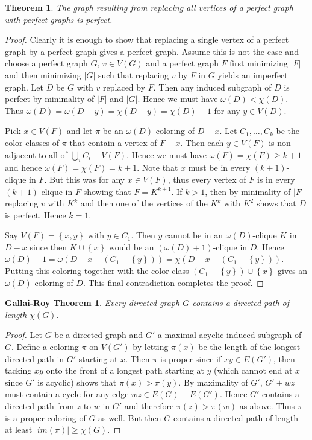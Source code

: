 \documentclass[12pt]{article}
\theoremstyle{plain}
\newtheorem{thm}{Theorem}
\newtheorem*{GallaiRoy}{Gallai-Roy Theorem}
\theoremstyle{definition}
\theoremstyle{remark}
\newcommand{\set}[1]{\left\{ #1 \right\}}
\newcommand{\card}[1]{\left|#1\right|}
\begin{document}
\begin{thm}
The graph resulting from replacing all vertices of a perfect graph with perfect graphs is perfect.
\end{thm}
\begin{proof}
Clearly it is enough to show that replacing a single vertex of a perfect graph by a perfect graph gives a perfect graph.  Assume this is not the case and choose a perfect graph $G$, $v \in V(G)$ and a perfect graph $F$ first minimizing $\card{F}$ and then minimizing $\card{G}$ such that replacing $v$ by $F$ in $G$ yields an imperfect graph.  Let $D$ be $G$ with $v$ replaced by $F$.  Then any induced subgraph of $D$ is perfect by minimality of $\card{F}$ and $\card{G}$.  Hence we must have $\omega(D) < \chi(D)$.  Thus $\omega(D) = \omega(D - y) = \chi(D - y) = \chi(D) - 1$ for any $y \in V(D)$.

Pick $x \in V(F)$ and let $\pi$ be an $\omega(D)$-coloring of $D-x$.  Let $C_1, \ldots, C_k$ be the color classes of $\pi$ that contain a vertex of $F-x$.  Then each $y \in V(F)$ is non-adjacent to all of $\bigcup_i C_i - V(F)$.  Hence we must have $\omega(F) = \chi(F) \geq k + 1$ and hence $\omega(F) = \chi(F) = k + 1$. Note that $x$ must be in every $(k+1)$-clique in $F$. But this was for any $x \in V(F)$, thus every vertex of $F$ is in every $(k+1)$-clique in $F$ showing that $F = K^{k+1}$.  If $k > 1$, then by minimality of $\card{F}$ replacing $v$ with $K^k$ and then one of the vertices of the $K^k$ with $K^2$ shows that $D$ is perfect.  Hence $k = 1$.

Say $V(F) = \set{x, y}$ with $y \in C_1$. Then $y$ cannot be in an $\omega(D)$-clique $K$ in $D-x$ since then $K \cup \set{x}$ would be an $(\omega(D) + 1)$-clique in $D$.  Hence $\omega(D) - 1 = \omega(D - x - (C_1 - \set{y})) = \chi(D - x - (C_1 - \set{y}))$.  Putting this coloring together with the color class $(C_1 - \set{y}) \cup \set{x}$ gives an $\omega(D)$-coloring of $D$.  This final contradiction completes the proof.
\end{proof}

\begin{GallaiRoy}
Every directed graph $G$ contains a directed path of length $\chi(G)$.
\end{GallaiRoy}
\begin{proof}
Let $G$ be a directed graph and $G'$ a maximal acyclic induced
subgraph of $G$.  Define a coloring $\pi$ on $V(G')$ by letting
$\pi(x)$ be the length of the longest directed path in $G'$ starting
at $x$. Then $\pi$ is proper since if $xy \in E(G')$, then tacking
$xy$ onto the front of a longest path starting at $y$ (which cannot
end at $x$ since $G'$ is acyclic) shows that $\pi(x) > \pi(y)$.  By
maximality of $G'$, $G' + wz$ must contain a cycle for any edge $wz
\in E(G) - E(G')$.  Hence $G'$ contains a directed path from $z$ to
$w$ in $G'$ and therefore $\pi(z) > \pi(w)$ as above.  Thus $\pi$ is a
proper coloring of $G$ as well.  But then $G$ contains a directed path
of length at least $\card{im(\pi)} \geq \chi(G)$.
\end{proof}
\end{document}
